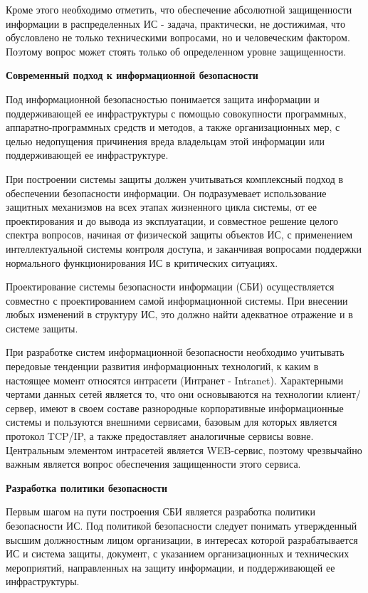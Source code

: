 Кроме этого необходимо отметить, что обеспечение абсолютной защищенности информации
в распределенных ИС - задача, практически, не достижимая, что обусловлено не только техническими вопросами,
но и человеческим фактором. Поэтому вопрос может стоять только об определенном уровне защищенности.

\bigbreak
\textbf{Современный подход к информационной безопасности}

Под информационной безопасностью понимается защита информации и поддерживающей ее инфраструктуры с помощью
совокупности программных, аппаратно-программных средств и методов, а также организационных мер, с целью недопущения
причинения вреда владельцам этой информации или поддерживающей ее инфраструктуре.

При построении системы защиты должен учитываться комплексный подход в обеспечении безопасности информации.
Он подразумевает использование защитных механизмов на всех этапах жизненного цикла системы, от ее проектирования
и до вывода из эксплуатации, и совместное решение целого спектра вопросов, начиная от физической защиты объектов ИС,
с применением интеллектуальной системы контроля доступа, и заканчивая вопросами поддержки нормального функционирования
ИС в критических ситуациях.

Проектирование системы безопасности информации (СБИ) осуществляется совместно с проектированием самой информационной системы.
При внесении любых изменений в структуру ИС, это должно найти адекватное отражение и в системе защиты.

При разработке систем информационной безопасности необходимо учитывать передовые тенденции развития информационных
технологий, к каким в настоящее момент относятся интрасети (Интранет - Intranet).
Характерными чертами данных сетей является то, что они основываются на технологии клиент/сервер, имеют в своем составе
разнородные корпоративные информационные системы и пользуются внешними сервисами, базовым для которых является
протокол TCP/IP, а также предоставляет аналогичные сервисы вовне. Центральным элементом интрасетей является
WEB-сервис, поэтому чрезвычайно важным является вопрос обеспечения защищенности этого сервиса.

\bigbreak
\textbf{Разработка политики безопасности}

Первым шагом на пути построения СБИ является разработка политики безопасности ИС.
Под политикой безопасности следует понимать утвержденный высшим должностным лицом организации, в
интересах которой разрабатывается ИС и система защиты, документ, с указанием организационных и технических мероприятий,
направленных на защиту информации, и поддерживающей ее инфраструктуры.


